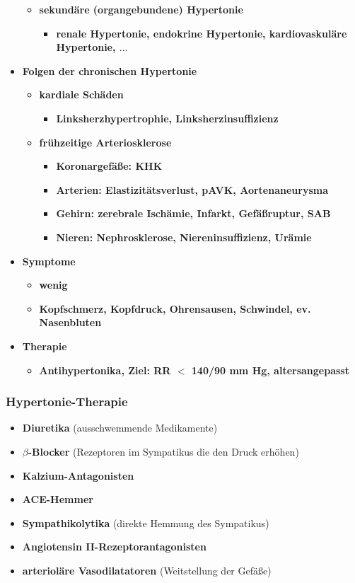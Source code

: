 \begin{itemize}
\begin{itemize}
					\item \textbf{sekundäre (organgebundene) Hypertonie}
						\begin{itemize}
							\item \textbf{renale Hypertonie, endokrine Hypertonie, kardiovaskuläre Hypertonie, $\dots$}
						\end{itemize}
				\end{itemize}
			\item \textbf{Folgen der chronischen Hypertonie}
				\begin{itemize}
					\item \textbf{kardiale Schäden}
						\begin{itemize}
							\item \textbf{Linksherzhypertrophie, Linksherzinsuffizienz}
						\end{itemize}
					\item \textbf{frühzeitige Arteriosklerose}
						\begin{itemize}
							\item \textbf{Koronargefäße: KHK}
							\item \textbf{Arterien: Elastizitätsverlust, pAVK, Aortenaneurysma}
							\item \textbf{Gehirn: zerebrale Ischämie, Infarkt, Gefäßruptur, SAB}
							\item \textbf{Nieren: Nephrosklerose, Niereninsuffizienz, Urämie}
						\end{itemize}
				\end{itemize}
			\item \textbf{Symptome}
				\begin{itemize}
					\item \textbf{wenig}
					\item \textbf{Kopfschmerz, Kopfdruck, Ohrensausen, Schwindel, ev. Nasenbluten}
				\end{itemize}
			\item \textbf{Therapie}
				\begin{itemize}
					\item \textbf{Antihypertonika, Ziel: RR $<$ 140/90 mm Hg, altersangepasst}
				\end{itemize}
		\end{itemize}		
	\subsubsection{Hypertonie-Therapie}
		\begin{itemize}
			\item \textbf{Diuretika} (ausschwemmende Medikamente)
			\item \textbf{$\beta$-Blocker} (Rezeptoren im Sympatikus die den Druck erhöhen)
			\item \textbf{Kalzium-Antagonisten}
			\item \textbf{ACE-Hemmer}
			\item \textbf{Sympathikolytika} (direkte Hemmung des Sympatikus)
			\item \textbf{Angiotensin II-Rezeptorantagonisten}
			\item \textbf{arterioläre Vasodilatatoren} (Weitstellung der Gefäße)
		\end{itemize}
	
